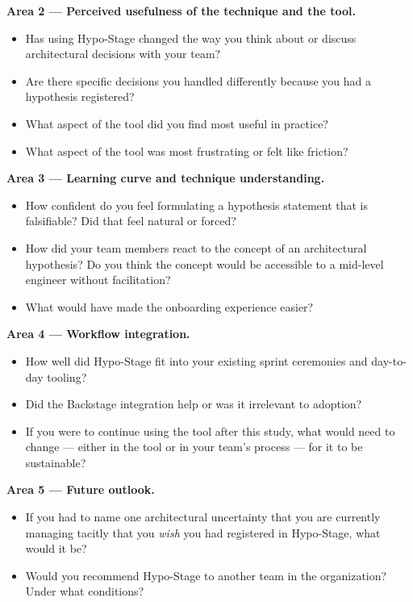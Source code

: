 \textbf{Area 2 --- Perceived usefulness of the technique and the tool.}
\begin{itemize}
  \item Has using Hypo-Stage changed the way you think about or discuss
    architectural decisions with your team?
  \item Are there specific decisions you handled differently because you had a
    hypothesis registered?
  \item What aspect of the tool did you find most useful in practice?
  \item What aspect of the tool was most frustrating or felt like friction?
\end{itemize}

\textbf{Area 3 --- Learning curve and technique understanding.}
\begin{itemize}
  \item How confident do you feel formulating a hypothesis statement that is
    falsifiable? Did that feel natural or forced?
  \item How did your team members react to the concept of an architectural
    hypothesis? Do you think the concept would be accessible to a mid-level
    engineer without facilitation?
  \item What would have made the onboarding experience easier?
\end{itemize}

\textbf{Area 4 --- Workflow integration.}
\begin{itemize}
  \item How well did Hypo-Stage fit into your existing sprint ceremonies and
    day-to-day tooling?
  \item Did the Backstage integration help or was it irrelevant to adoption?
  \item If you were to continue using the tool after this study, what would
    need to change --- either in the tool or in your team's process --- for it to
    be sustainable?
\end{itemize}

\textbf{Area 5 --- Future outlook.}
\begin{itemize}
  \item If you had to name one architectural uncertainty that you are currently
    managing tacitly that you \emph{wish} you had registered in Hypo-Stage,
    what would it be?
  \item Would you recommend Hypo-Stage to another team in the organization?
    Under what conditions?
\end{itemize}


